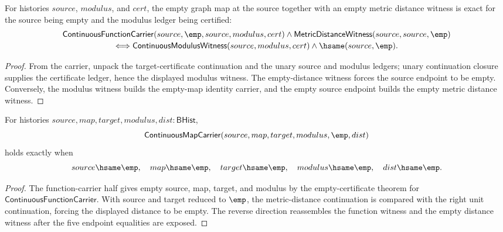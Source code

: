 \begin{theorem}
\label{thm:continuousmap-empty-map-empty-distance}
For histories $source$, $modulus$, and $cert$, the empty graph map at the
source together with an empty metric distance witness is exact for the source
being empty and the modulus ledger being certified:
$$
\begin{array}{c}
\mathsf{ContinuousFunctionCarrier}(source,\emp,source,modulus,cert)
\land
\mathsf{MetricDistanceWitness}(source,source,\emp)
\\[2pt]
\Longleftrightarrow
\mathsf{ContinuousModulusWitness}(source,modulus,cert)
\land
\hsame(source,\emp).
\end{array}
$$
\end{theorem}
\begin{proof}
From the carrier, unpack the target-certificate continuation and the unary
source and modulus ledgers; unary continuation closure supplies the certificate
ledger, hence the displayed modulus witness. The empty-distance witness forces
the source endpoint to be empty. Conversely, the modulus witness builds the
empty-map identity carrier, and the empty source endpoint builds the empty
metric distance witness.
\end{proof}

\begin{theorem}
\label{thm:continuousmap-carrier-empty-cert-exactness}
For histories $source,map,target,modulus,dist:\mathsf{BHist}$,
$$
\mathsf{ContinuousMapCarrier}(source,map,target,modulus,\emp,dist)
$$
holds exactly when
$$
source \hsame \emp,\quad map \hsame \emp,\quad target \hsame \emp,\quad
modulus \hsame \emp,\quad dist \hsame \emp .
$$
\end{theorem}
\begin{proof}
The function-carrier half gives empty source, map, target, and modulus by the
empty-certificate theorem for $\mathsf{ContinuousFunctionCarrier}$. With source
and target reduced to $\emp$, the metric-distance continuation is compared with
the right unit continuation, forcing the displayed distance to be empty. The
reverse direction reassembles the function witness and the empty distance
witness after the five endpoint equalities are exposed.
\end{proof}

